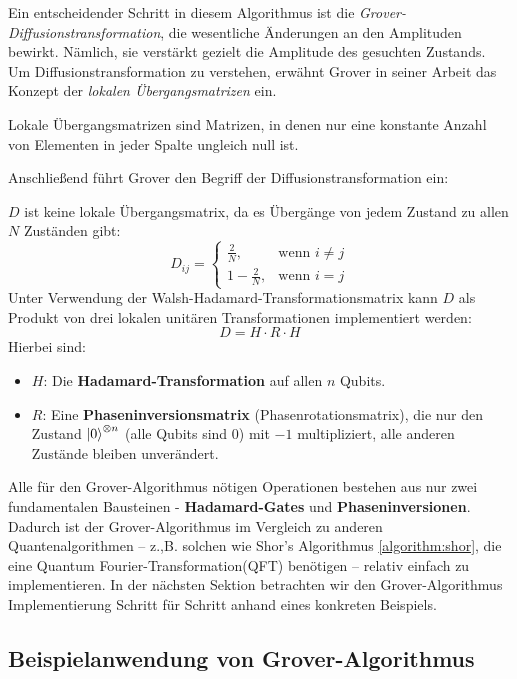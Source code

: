Ein entscheidender Schritt in diesem Algorithmus ist die \textit{Grover-Diffusions\-transformation}, die wesentliche Änderungen an den Amplituden bewirkt. Nämlich, sie verstärkt gezielt die Amplitude des gesuchten Zustands. Um Diffusionstransformation zu verstehen, erwähnt Grover in seiner Arbeit das Konzept der \textit{lokalen Übergangsmatrizen} ein.

\begin{definition}
Lokale Übergangsmatrizen sind Matrizen, in denen nur eine konstante Anzahl von Elementen in jeder Spalte ungleich null ist.
\end{definition}

Anschließend führt Grover den Begriff der Diffusionstransformation ein:

\begin{definition}
\( D \) ist keine lokale Übergangs\-matrix, da es Übergänge von jedem Zustand zu allen \( N \) Zuständen gibt:
$$
D_{ij} = 
\begin{cases}
\frac{2}{N}, & \text{wenn } i \ne j \\
1 - \frac{2}{N}, & \text{wenn } i = j
\end{cases}
$$
Unter Verwendung der Walsh-Hadamard-Transformationsmatrix kann \( D \) als Produkt von drei lokalen unitären Transformationen implementiert werden:
$$
D = H \cdot R \cdot H
$$
Hierbei sind:
\begin{itemize}
\item $H$: Die \textbf{Hadamard-Transformation} auf allen $n$ Qubits.
\item $R$: Eine \textbf{Phaseninversionsmatrix} (Phasenrotationsmatrix), die nur den Zustand $\ket{0}^{\otimes n}$ (alle Qubits sind 0) mit $-1$ multipliziert, alle anderen Zustände bleiben unverändert.
\end{itemize}
\end{definition}

Alle für den Grover-Algorithmus nötigen Operationen bestehen aus nur zwei fundamentalen Bausteinen - \textbf{Hadamard-Gates} und \textbf{Phaseninversionen}. Dadurch ist der Grover-Algorithmus im Vergleich zu anderen Quantenalgorithmen – z.,B. solchen wie Shor's Algorithmus \ref{algorithm:shor}, die eine Quantum Fourier-Transformation(QFT) benötigen – relativ einfach zu implementieren. In der nächsten Sektion betrachten wir den Grover-Algorithmus Implementierung Schritt für Schritt anhand eines konkreten Beispiels.

\subsection{Beispielanwendung von Grover-Algorithmus}

